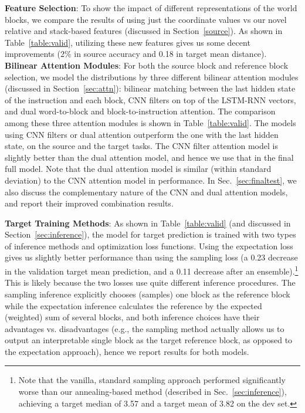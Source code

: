 \documentclass[letterpaper]{article} %
\begin{document}
\textbf{Feature Selection}:
To show the impact of different representations of the world blocks, we compare the results of using just the coordinate values vs our novel relative and stack-based features (discussed in Section~\ref{source}).
As shown in Table~\ref{table:valid}, utilizing these new features gives us some decent improvements (2\% in source accuracy and 0.18 in target mean distance).  \textbf{Bilinear Attention Modules}:
For both the source block and reference block selection, we model the distributions by three different bilinear attention modules (discussed in Section~\ref{sec:attn}): bilinear matching between the last hidden state of the instruction and each block, CNN filters on top of the LSTM-RNN vectors, and dual word-to-block and block-to-instruction attention. The comparison among these three attention modules is shown in Table~\ref{table:valid}.
The models using CNN filters or dual attention outperform the one with the last hidden state, on the source and the target tasks. The CNN filter attention model is slightly better than the dual attention model, and hence we use that in the final full model. Note that the dual attention model is similar (within standard deviation) to the CNN attention model in performance. In Sec.~\ref{sec:finaltest}, we also discuss the complementary nature of the CNN and dual attention models, and report their improved combination results.




\textbf{Target Training Methods}:
As shown in Table~\ref{table:valid} (and discussed in Section~\ref{sec:inference}), the model for target prediction is trained with two types of inference methods and optimization loss functions. Using the expectation loss gives us slightly better performance than using the sampling loss (a 0.23 decrease in the validation target mean prediction, and a 0.11 decrease after an ensemble).\footnote{Note that the vanilla, standard sampling approach performed significantly worse than our annealing-based method (described in Sec.~\ref{sec:inference}), achieving a target median of 3.57 and a target mean of 3.82 on the dev set.}
This is likely because the two losses use quite different inference procedures. The sampling inference explicitly chooses (samples) one block as the reference block while the expectation inference calculates the reference by the expected (weighted) sum of several blocks, and both inference choices have their advantages vs. disadvantages (e.g., the sampling method actually allows us to output an interpretable single block as the target reference block, as opposed to the expectation approach), hence we report results for both models.
\end{document}

